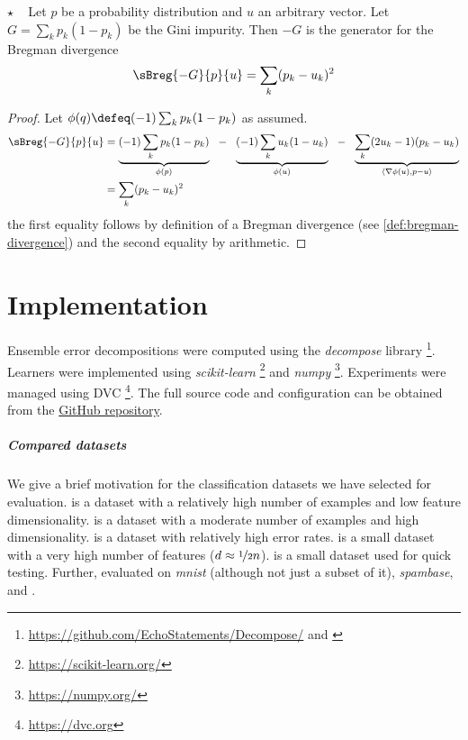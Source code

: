 \documentclass[
	twoside=false, %
]{kaobook}
\begin{document}
\begin{proposition} $\star$ ~ Let $p$ be a probability distribution and $u$ an arbitrary vector.
    Let $G =\sum_{k} p_{k}(1-p_{k})$ be the Gini impurity. Then $-G$ is the generator for the Bregman divergence
$$
\sBreg{-G}{p}{u} = \sum_{k}(p_{k}-u_{k})^2
$$
\label{thm:gini-bregman}
\end{proposition}
\begin{proof}
Let $\phi(q) \defeq (-1) \sum_{k} p_{k}(1-p_{k})$ as assumed.
 \begin{align*}
\sBreg{-G}{p}{u} &=  
\underbrace{(-1) \sum_{k} p_{k}(1-p_{k})}_{\phi(p)} 
 ~ ~ - ~ ~  
\underbrace{(-1) \sum_{k} u_{k}(1-u_{k})}_{\phi(u)}  
~ ~ - ~ ~  
\underbrace{\sum_{k} (2u_{k}-1)(p_{k}-u_{k})}_{\langle \nabla \phi(u), p-u \rangle} \\  
 &= \sum_{k} (p_{k}-u_{k})^2
\end{align*}
the first equality follows by definition of a Bregman divergence (see \ref{def:bregman-divergence}) and the second equality by arithmetic.
\end{proof}

\chapter{Implementation}

Ensemble error decompositions were computed using the \textit{decompose} library
\footnote{
  \url{https://github.com/EchoStatements/Decompose/} and \cite{wood_BiasVarianceDecompositionsMargin_2022}
}. Learners were implemented using \textit{scikit-learn} \footnote{
  \url{https://scikit-learn.org/}
} and \textit{numpy} \footnote{\url{https://numpy.org/}}.
Experiments were managed using \textsc{DVC} \footnote{\url{https://dvc.org}}. The full source code and configuration can be obtained from the \href{https://github.com/xnhp/}{GitHub repository}. 

\paragraph{Compared datasets} We give a brief motivation for the classification datasets we have selected for evaluation. 
\cover is a dataset with a relatively high number of examples and low feature dimensionality. \mnist is a dataset with a moderate number of examples and high dimensionality. \diabetes is a dataset with relatively high error rates. \bioresponse is a small dataset with a very high number of features ($d \approx \nicefrac{1}{2}n$). \qsar is a small dataset used for quick testing.
Further, \cite{bernard_DynamicRandomForests_2012, xu_ImplementationPerformanceOptimization_2017} evaluated on \textit{mnist} (although not just a subset of it), \textit{spambase}, \digits and \diabetes.
\end{document}
